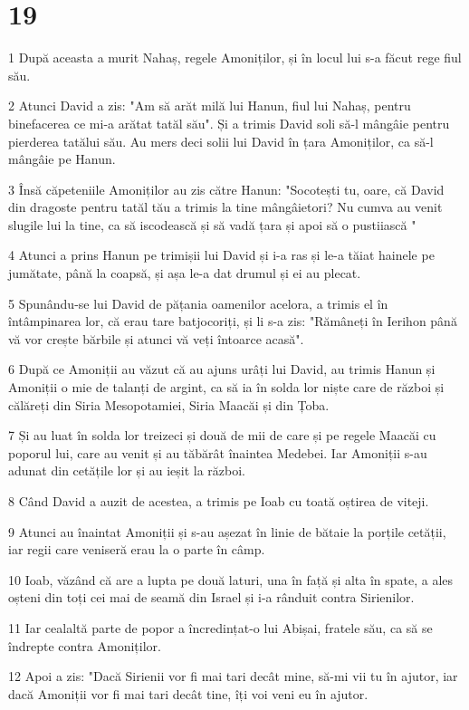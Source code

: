 \chapter{19}

\par 1 După aceasta a murit Nahaș, regele Amoniților, și în locul lui s-a făcut rege fiul său.
\par 2 Atunci David a zis: "Am să arăt milă lui Hanun, fiul lui Nahaș, pentru binefacerea ce mi-a arătat tatăl său". Și a trimis David soli să-l mângâie pentru pierderea tatălui său. Au mers deci solii lui David în țara Amoniților, ca să-l mângâie pe Hanun.
\par 3 Însă căpeteniile Amoniților au zis către Hanun: "Socotești tu, oare, că David din dragoste pentru tatăl tău a trimis la tine mângâietori? Nu cumva au venit slugile lui la tine, ca să iscodească și să vadă țara și apoi să o pustiiască "
\par 4 Atunci a prins Hanun pe trimișii lui David și i-a ras și le-a tăiat hainele pe jumătate, până la coapsă, și așa le-a dat drumul și ei au plecat.
\par 5 Spunându-se lui David de pățania oamenilor acelora, a trimis el în întâmpinarea lor, că erau tare batjocoriți, și li s-a zis: "Rămâneți în Ierihon până vă vor crește bărbile și atunci vă veți întoarce acasă".
\par 6 După ce Amoniții au văzut că au ajuns urâți lui David, au trimis Hanun și Amoniții o mie de talanți de argint, ca să ia în solda lor niște care de război și călăreți din Siria Mesopotamiei, Siria Maacăi și din Țoba.
\par 7 Și au luat în solda lor treizeci și două de mii de care și pe regele Maacăi cu poporul lui, care au venit și au tăbărât înaintea Medebei. Iar Amoniții s-au adunat din cetățile lor și au ieșit la război.
\par 8 Când David a auzit de acestea, a trimis pe Ioab cu toată oștirea de viteji.
\par 9 Atunci au înaintat Amoniții și s-au așezat în linie de bătaie la porțile cetății, iar regii care veniseră erau la o parte în câmp.
\par 10 Ioab, văzând că are a lupta pe două laturi, una în față și alta în spate, a ales oșteni din toți cei mai de seamă din Israel și i-a rânduit contra Sirienilor.
\par 11 Iar cealaltă parte de popor a încredințat-o lui Abișai, fratele său, ca să se îndrepte contra Amoniților.
\par 12 Apoi a zis: "Dacă Sirienii vor fi mai tari decât mine, să-mi vii tu în ajutor, iar dacă Amoniții vor fi mai tari decât tine, îți voi veni eu în ajutor.
